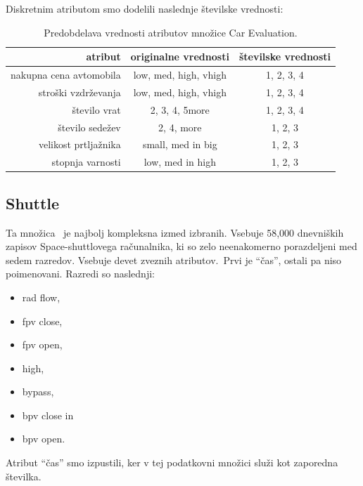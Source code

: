 \documentclass[a4paper,12pt,openright]{book}
\begin{document}
    Diskretnim atributom smo dodelili naslednje številske vrednosti:
    \begin{table}[H]
        \centering
        \begin{tabular}{||r c c||}
            \hline
            atribut                 & originalne vrednosti   & številske vrednosti \\ \hline
            nakupna cena avtomobila & low, med, high, vhigh & 1, 2, 3, 4          \\ \hline
            stroški vzdrževanja     & low, med, high, vhigh & 1, 2, 3, 4          \\ \hline
            število vrat            & 2, 3, 4, 5more        & 1, 2, 3, 4          \\ \hline
            število sedežev         & 2, 4, more            & 1, 2, 3             \\ \hline
            velikost prtljažnika    & small, med in big     & 1, 2, 3             \\ \hline
            stopnja varnosti        & low, med in high      & 1, 2, 3             \\ \hline
        \end{tabular}
        \caption{Predobdelava vrednosti atributov množice Car Evaluation.}
        \label{tab:car_predobdelava}
    \end{table}


    \subsection{Shuttle}\label{subsec:statlog-shuttle}
    Ta množica~\cite{misc_statlog_shuttle_148} je najbolj kompleksna izmed izbranih.
    Vsebuje 58,000 dnev\-ni\-ških zapisov Space-shuttlovega računalnika, ki so zelo neenakomerno porazdeljeni med sedem razredov.
    Vsebuje devet zveznih atributov.\ Prvi je \enquote{čas}, ostali pa niso poimenovani.
    Razredi so naslednji:
    \begin{itemize}
        \item rad flow,
        \item fpv close,
        \item fpv open,
        \item high,
        \item bypass,
        \item bpv close in
        \item bpv open.
    \end{itemize}

    Atribut \enquote{čas} smo izpustili, ker v tej podatkovni množici služi kot zaporedna številka.
\end{document}
